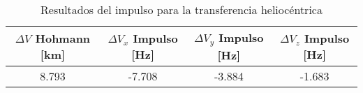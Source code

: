 \begin{table}[H] 
\centering 
\captionsetup{justification=centering,margin=10mm} 
\caption{Resultados del impulso para la transferencia heliocéntrica} 
	{\renewcommand{\arraystretch}{1.2} 
	\begin{tabular}{cccc} 
		$\Delta V$ Hohmann [km] & $\Delta V_x$ Impulso [Hz] & $\Delta V_y$ Impulso [Hz] & $\Delta V_z$ Impulso [Hz] \\ 
		\hline 
		8.793 & -7.708 & -3.884 & -1.683 \\ 
		\hline 
	\end{tabular} 
	} 
\label{tab:Report_HE} 
\end{table}